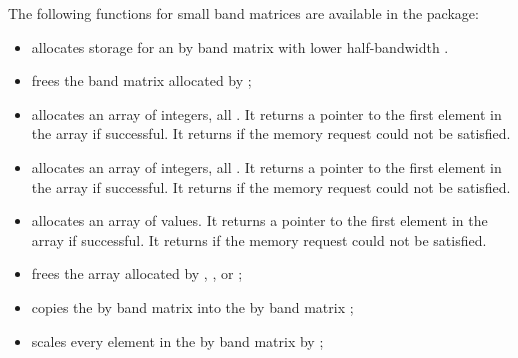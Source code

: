 The following functions for small band matrices are available in the
{\band} package:
\begin{itemize}

\item {}
  \par {} allocates storage for an  by 
  band matrix with lower half-bandwidth .

\item {}
  \par {} frees the band matrix  allocated by ;

\item {}
  \par {} allocates an array of  integers, all . 
  It returns a pointer to the first element in the array if successful. 
  It returns  if the memory request could not be satisfied.

\item {}
  \par {} allocates an array of  integers, all .
  It returns a pointer to the first element in the array if successful. 
  It returns  if the memory request could not be satisfied.

\item {}
  \par {} allocates an array of   values. 
  It returns a pointer to the first element in the array if successful. 
  It returns  if the memory request could not be satisfied.

\item {}
  \par {} frees the array  allocated by ,
  , or ;

\item {}
  \par {} copies the  by  band 
  matrix  into the  by  band matrix ;

\item {}
  \par {} scales every element in the  by  band
  matrix  by ;


\end{itemize}
